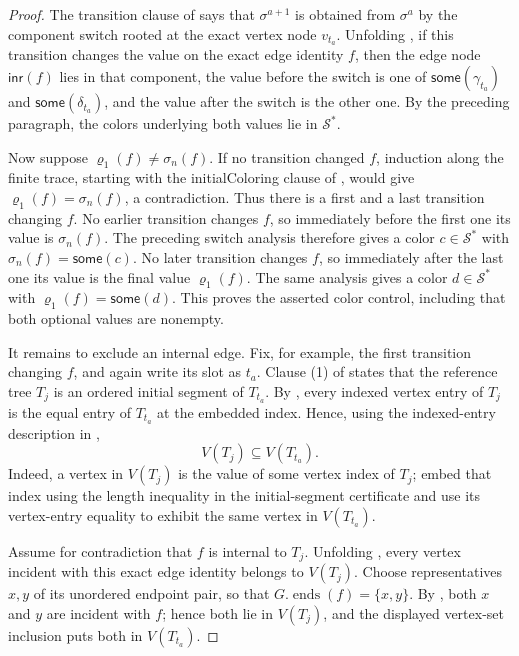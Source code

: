 \begin{proof}
The transition clause of
 says that \(\sigma^{a+1}\) is
obtained from \(\sigma^a\) by the component switch rooted at the exact
vertex node \(v_{t_a}\).  Unfolding
, if this transition changes the value
on the exact edge identity \(f\), then the edge node
\(\mathsf{inr}(f)\) lies in that component, the value before the switch
is one of
\(\mathsf{some}(\gamma_{t_a})\) and
\(\mathsf{some}(\delta_{t_a})\), and the value after the switch is the
other one.  By the preceding paragraph, the colors underlying both
values lie in \(\mathcal S^*\).

Now suppose \(\varrho_1(f)\ne\sigma_n(f)\).  If no transition changed
\(f\), induction along the finite trace, starting with the
initialColoring clause of , would
give \(\varrho_1(f)=\sigma_n(f)\), a contradiction.  Thus there is a
first and a last transition changing \(f\).  No earlier transition
changes \(f\), so immediately before the first one its value is
\(\sigma_n(f)\).  The preceding switch analysis therefore gives a color
\(c\in\mathcal S^*\) with
\(\sigma_n(f)=\mathsf{some}(c)\).  No later transition changes \(f\), so
immediately after the last one its value is the final value
\(\varrho_1(f)\).  The same analysis gives a color
\(d\in\mathcal S^*\) with
\(\varrho_1(f)=\mathsf{some}(d)\).  This proves the asserted color
control, including that both optional values are nonempty.

It remains to exclude an internal edge.  Fix, for example, the first
transition changing \(f\), and again write its slot as \(t_a\).  Clause
(1) of  states that the
reference tree \(T_j\) is an ordered initial segment of \(T_{t_a}\).
By , every indexed vertex entry of
\(T_j\) is the equal entry of \(T_{t_a}\) at the embedded index.  Hence,
using the indexed-entry description in ,
\[
                         V(T_j)\subseteq V(T_{t_a}).
\]
Indeed, a vertex in \(V(T_j)\) is the value of some vertex index of
\(T_j\); embed that index using the length inequality in the
initial-segment certificate and use its vertex-entry equality to exhibit
the same vertex in \(V(T_{t_a})\).

Assume for contradiction that \(f\) is internal to \(T_j\).  Unfolding
, every vertex incident with this exact edge
identity belongs to \(V(T_j)\).  Choose representatives \(x,y\) of its
unordered endpoint pair, so that
\(G.\operatorname{ends}(f)=\{x,y\}\).  By , both
\(x\) and \(y\) are incident with \(f\); hence both lie in \(V(T_j)\),
and the displayed vertex-set inclusion puts both in \(V(T_{t_a})\).


\end{proof}
